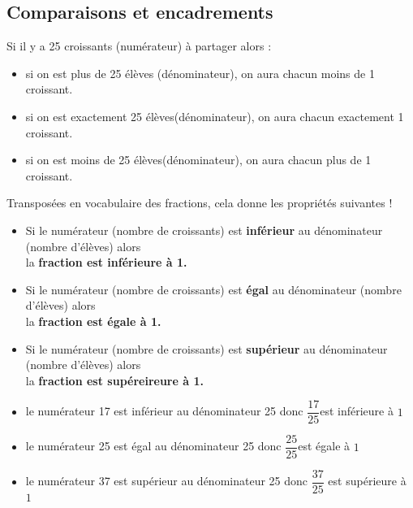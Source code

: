 \begin{changemargin}{0mm}{-15mm}
    \section{Comparaisons et encadrements}
    \begin{remarque}

        Si il y a 25 croissants (numérateur) à partager alors :
        \begin{itemize}
            \item si on est plus de 25 élèves (dénominateur), on aura chacun moins de 1 croissant.
            \item si on est exactement 25 élèves(dénominateur), on aura chacun exactement 1 croissant.
            \item si on est moins de 25 élèves(dénominateur), on aura chacun plus de 1 croissant.
        \end{itemize}
        Transposées en vocabulaire des fractions, cela donne les propriétés suivantes !
    \end{remarque}
\begin{propriete}[\admise]
    \begin{itemize}
        \item Si le numérateur (nombre de croissants) est \textbf{inférieur} au dénominateur (nombre d'élèves) alors \\la \textbf{fraction est inférieure à 1.}
        \item Si le numérateur (nombre de croissants) est \textbf{égal} au dénominateur (nombre d'élèves) alors \\la \textbf{fraction est égale à 1.}
        \item Si le numérateur (nombre de croissants) est \textbf{supérieur} au dénominateur (nombre d'élèves) alors \\la \textbf{fraction est supéreireure à 1.}
    \end{itemize}
\end{propriete}
\begin{exemples*1} 
    \begin{itemize}
        \item le numérateur 17 est inférieur au dénominateur 25 donc $\dfrac{17}{25}$est inférieure à $1$
        \item le numérateur 25 est égal au dénominateur 25 donc $\dfrac{25}{25}$est égale à $1$
        \item le numérateur 37 est supérieur au dénominateur 25 donc $\dfrac{37}{25}$ est supérieure à $1$
    \end{itemize}
    \vspace*{-5mm}
\end{exemples*1} 


\end{changemargin}

